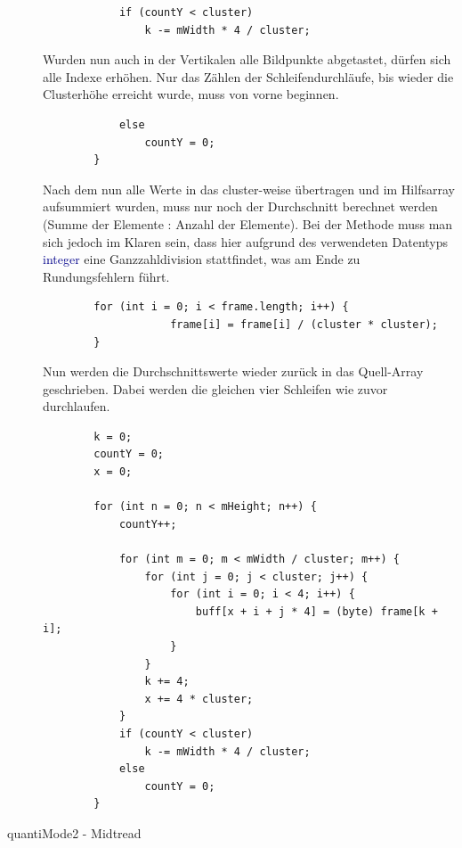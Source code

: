 \begin{description}
\begin{lstlisting}            
            if (countY < cluster)                                                                   
                k -= mWidth * 4 / cluster;                                                          
\end{lstlisting}
Wurden nun auch in der Vertikalen alle Bildpunkte abgetastet, dürfen sich alle Indexe erhöhen. Nur das Zählen der Schleifendurchläufe, bis wieder die Clusterhöhe erreicht wurde, muss von vorne beginnen.
\begin{lstlisting}
            else
                countY = 0;                                                                         
        }
\end{lstlisting}
Nach dem nun alle Werte in das cluster-weise übertragen und im Hilfsarray aufsummiert wurden, muss nur noch der Durchschnitt berechnet werden (Summe der Elemente : Anzahl der Elemente). Bei der Methode muss man sich jedoch im Klaren sein, dass hier aufgrund des verwendeten Datentyps \textcolor{darkblue}{integer} eine Ganzzahldivision stattfindet, was am Ende zu Rundungsfehlern führt.
\begin{lstlisting}
        for (int i = 0; i < frame.length; i++) {
                    frame[i] = frame[i] / (cluster * cluster);
        }
\end{lstlisting}
Nun werden die Durchschnittswerte wieder zurück in das Quell-Array geschrieben. Dabei werden die gleichen vier Schleifen wie zuvor durchlaufen. 
\begin{lstlisting}
        k = 0;
        countY = 0;
        x = 0;

        for (int n = 0; n < mHeight; n++) {
            countY++;

            for (int m = 0; m < mWidth / cluster; m++) {
                for (int j = 0; j < cluster; j++) {
                    for (int i = 0; i < 4; i++) {
                        buff[x + i + j * 4] = (byte) frame[k + i];
                    }
                }
                k += 4;
                x += 4 * cluster;
            }
            if (countY < cluster)
                k -= mWidth * 4 / cluster;
            else
                countY = 0;
        }
\end{lstlisting}


\item[quantiMode2 - Midtread]~\par
\label{quantimode2}


\end{description}
